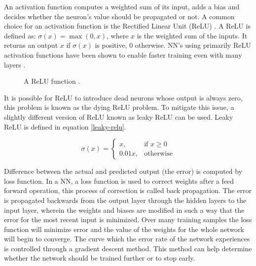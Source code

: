 An activation function computes a weighted sum of its input, adds a bias and decides whether the neuron's value should be propagated or not. A common choice for an activation function is the Rectified Linear Unit (ReLU) \cite{Relu}. A ReLU is defined as: $\sigma(x) = \max(0, x)$, where $x$ is the weighted sum of the inputs. It returns an output $x$ if $\sigma(x)$ is positive, $0$ otherwise. NN's using primarily ReLU activation functions have been shown to enable faster training even with many layers \cite{cnn-star-galaxy}.

\begin{figure}\label{fig:relu}
\caption{A ReLU function \cite{reluimage}.}
\end{figure}

It is possible for ReLU to introduce dead neurons whose output is always zero, this problem is known as the dying ReLU problem. To mitigate this issue, a slightly different version of ReLU known as leaky ReLU can be used. Leaky ReLU is defined in equation \ref{leaky-relu}.

\begin{equation}
\sigma(x) =
\begin{cases} \label{leaky-relu}
    x      , & \text{if } x\geq 0\\
    0.01x , & \text{otherwise}
\end{cases}
\end{equation}

Difference between the actual and predicted output (the error) is computed by loss function. In a NN, a loss function is used to correct weights after a feed forward operation, this process of correction is called back propagation. The error is propagated backwards from the output layer through the hidden layers to the input layer, wherein the weights and biases are modified in such a way that the error for the most recent input is minimized. Over many training samples the loss function will minimize error and the value of the weights for the whole network will begin to converge. The curve which the error rate of the network experiences is controlled through a gradient descent method. This method can help determine whether the network should be trained further or to stop early.

